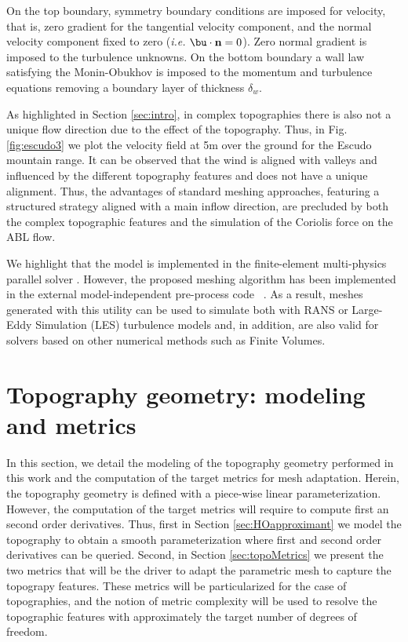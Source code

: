 \documentclass[1p]{elsarticle}
\begin{document}
On the top boundary, symmetry boundary conditions are imposed for velocity, that is, zero gradient for the tangential velocity component, and the normal velocity component  fixed to zero ({\it i.e.} $\bu\cdot\mathbf n =0$).  Zero normal gradient is  imposed to the turbulence unknowns. 
On the bottom boundary a wall law satisfying the Monin-Obukhov  \cite{monin1954basic} is imposed to the momentum and turbulence equations removing a boundary layer of thickness $\delta_w$.

As highlighted in Section \ref{sec:intro},
in complex topographies there is also not a unique flow direction due to the effect of the topography. Thus, in Fig. \ref{fig:escudo3} we plot 
the velocity field at 5m over the ground for the Escudo mountain range.
It can be observed that the wind is aligned with valleys and influenced by the different topography features and does not have a unique alignment.
Thus, the advantages of standard meshing approaches, featuring a structured strategy aligned with a main inflow direction, are precluded by both the complex topographic features and the simulation of the Coriolis force on the ABL flow.

We highlight that the model 
is implemented in the finite-element multi-physics parallel solver {\alya} \cite{houzeaux:alyaFractional,vazquez:alyaExascale}. However, the proposed meshing algorithm has been implemented in the external model-independent pre-process code \xWindMesh\ \cite{avila:CFDframworkWindFarms,gargallo:meshForABLandWindFarms,gargallo2018JCP:WindFarms,gargallo2017subdividing}. As a result, meshes generated with this utility can be used to simulate both with RANS or Large-Eddy Simulation (LES) turbulence models and, in addition, are also valid for solvers based on other numerical methods such as Finite Volumes.


\section{Topography geometry: modeling and metrics}
\label{sec:geometry}

In this section, we detail the modeling of the topography geometry performed in this work and the computation of the target metrics for mesh adaptation.
Herein, the topography geometry is defined with a piece-wise linear parameterization.
However, the computation of the target metrics will require to compute first an second order derivatives. Thus, first in Section \ref{sec:HOapproximant} we 
 model the topography to obtain a smooth parameterization where first and second order derivatives can be queried.
Second, in Section \ref{sec:topoMetrics} we present the two metrics that will be the driver to adapt the parametric mesh to capture the topograpy features. These metrics will be particularized for the case of topographies, and the notion of metric complexity will be used to resolve the topographic features with approximately the target number of degrees of freedom.
\end{document}
